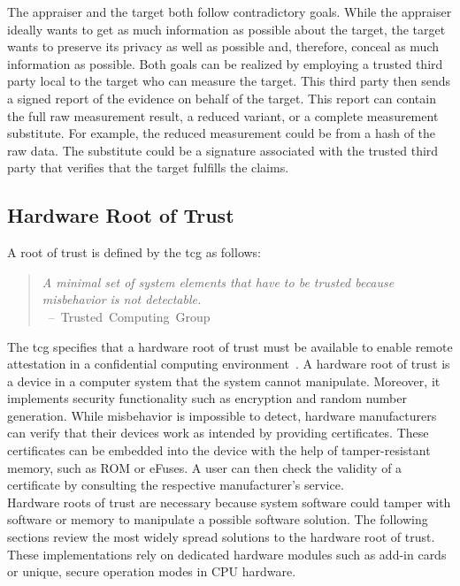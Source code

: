 The appraiser and the target both follow contradictory goals. While the appraiser
ideally wants to get as much information as possible about the target, the
target wants to preserve its privacy as well as possible and, therefore, conceal
as much information as possible. Both goals can be realized by employing a
trusted third party local to the target who can measure the target. This
third party then sends a signed report of the evidence on behalf of the
target. This report can contain the full raw measurement result, a reduced
variant, or a complete measurement substitute. For example, the reduced
measurement could be from a hash of the raw data. The substitute could be a
signature associated with the trusted third party that verifies that the target
fulfills the claims.

\subsection{Hardware Root of Trust}
\label{sec:20:hardware_root_of_trust}
A root of trust is defined by the \gls{tcg} as follows:
\begin{quote}
  \textit{ A minimal set of system elements that have to be trusted because
    misbehavior is not detectable. \\
  } \mbox{ -- Trusted Computing Group~\cite{tpm_architecture}}
\end{quote}

The \gls{tcg} specifies that a hardware root of trust must be
available to enable remote attestation in a confidential computing
environment~\cite{tpm_architecture}. A hardware root of trust is a device in a
computer system that the system cannot manipulate. Moreover, it implements
security functionality such as encryption and random number generation. While
misbehavior is impossible to detect, hardware manufacturers can verify that
their devices work as intended by providing certificates. These certificates can
be embedded into the device with the help of tamper-resistant memory, such as
ROM or eFuses. A user can then check the validity of a certificate by consulting
the respective manufacturer's service. \\

Hardware roots of trust are necessary because system software could tamper with
software or memory to manipulate a possible software solution. The following
sections review the most widely spread solutions to the hardware root of
trust. These implementations rely on dedicated hardware modules such as add-in
cards or unique, secure operation modes in CPU hardware. \\

